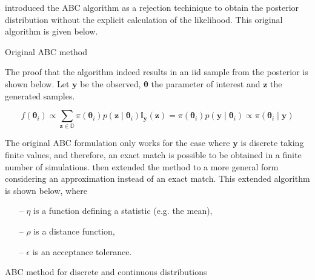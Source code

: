 \documentclass[runningheads]{llncs}
\begin{document}
\citet{Tavare505} introduced the ABC algorithm as a rejection
techinique to obtain the posterior distribution without the explicit
calculation of the likelihood. This original algorithm is given below.

\begin{algorithm}[H]
\SetAlgoLined
{}
 \caption{Original ABC method}
\end{algorithm}

The proof that the algorithm indeed results in an iid sample
from the posterior is shown below. Let $\bm y$ be the observed,
$\bm \theta$ the parameter of interest and $\bm z$ the generated
samples.

\begin{equation}
  f(\bm \theta_i) \propto \sum_{\bm z \in \mathbb{D}}
  \pi(\bm \theta_i) p(\bm z \mid \bm \theta_i) \mathbb I_{\bm y}(\bm z)
  = \pi(\bm \theta_i) p(\bm y \mid \bm \theta_i) \propto
  \pi(\bm \theta_i \mid \bm y)
\end{equation}

The original ABC formulation only works for
the case where $\bm y$ is discrete
taking finite values, and therefore, an exact match is possible
to be obtained in a finite number of simulations. \citet{Pritchard1999}
then extended the method to a more general form considering an
approximation instead of an exact match. This extended algorithm is
shown below, where

\begin{itemize}
  \item[--] $\eta$ is a function defining a statistic (e.g. the mean),
  \item[--] $\rho$ is a distance function,
  \item[--] $\epsilon$ is an acceptance tolerance.
\end{itemize}

\begin{algorithm}[H]
\SetAlgoLined
{}
 \caption{ABC method for discrete and continuous distributions}
\end{algorithm}
\end{document}
